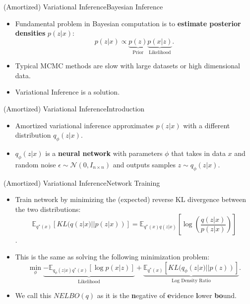 \documentclass[handout]{beamer}
\newcommand{\E}{\mathbb{E}}
\begin{document}
\begin{frame}{(Amortized) Variational Inference}{Bayesian Inference}
  \begin{itemize}
  \item {
    Fundamental problem in Bayesian computation is to \textbf{estimate posterior densities} $p(z|x)$:
  }
  \begin{equation*}
p(z|x)\propto \underbrace{p(z)}_\text{Prior}\underbrace{p(x|z)}_\text{Likelihood}.
\end{equation*}
  \item {
    Typical MCMC methods are slow with large datasets or high dimensional data.
  }
  \vspace{0.5cm}
  \item {
    Variational Inference is a solution.
  }
  \end{itemize}
\end{frame}
\begin{frame}{(Amortized) Variational Inference}{Introduction}
\begin{itemize}
\item Amortized variational inference approximates $p(z|x)$ with a different distribution $q_\phi(z|x)$.
\item $q_\phi(z|x)$ is a \textbf{neural network} with parameters $\phi$ that takes in data $x$ and random noise $\epsilon\sim \mathcal{N}(0,I_{n\times n})$ and outputs samples $z\sim q_\phi(z|x)$.
\begin{figure}[h]
  \centering
\end{figure}
\end{itemize}
\end{frame}
\begin{frame}{(Amortized) Variational Inference}{Network Training}
\begin{itemize}
\item Train network by minimizing the (expected) reverse KL divergence between the two distributions:
\[\E_{q^*(x)}[KL(q(z|x)||p(z|x))]=\mathbb{E}_{q^*(x)q(z|x)}\left[\log \left(\frac{q(z|x)}{p(z|x)}\right)\right]\].
\item This is the same as solving the following minimization problem:
\[\min_\phi \underbrace{-\mathbb{E}_{q_\phi(z|x)q^*(x)}[\log p(x|z)]}_{\text{Likelihood}}+\underbrace{\mathbb{E}_{q^*(x)}[KL(q_\phi(z|x)||p(z))]}_{\text{Log Density Ratio}}.\]
\item We call this $NELBO(q)$ as it is the \textbf{n}egative of \textbf{e}vidence \textbf{l}ower \textbf{bo}und.
\end{itemize}
\end{frame}
\end{document}
